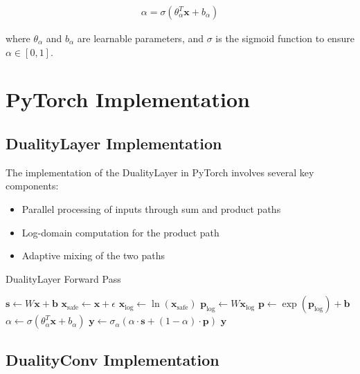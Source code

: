 \documentclass{article}
\begin{document}
\begin{align}
\alpha = \sigma(\theta_\alpha^T \mathbf{x} + b_\alpha)
\end{align}

where $\theta_\alpha$ and $b_\alpha$ are learnable parameters, and $\sigma$ is the sigmoid function to ensure $\alpha \in [0, 1]$.

\section{PyTorch Implementation}

\subsection{DualityLayer Implementation}

The implementation of the DualityLayer in PyTorch involves several key components:

\begin{itemize}
    \item Parallel processing of inputs through sum and product paths
    \item Log-domain computation for the product path
    \item Adaptive mixing of the two paths
\end{itemize}

\begin{algorithm}
\caption{DualityLayer Forward Pass}
\begin{algorithmic}[1]
    \State $\mathbf{s} \gets W\mathbf{x} + \mathbf{b}$ 
    \State $\mathbf{x}_{\text{safe}} \gets \mathbf{x} + \epsilon$ 
    \State $\mathbf{x}_{\text{log}} \gets \ln(\mathbf{x}_{\text{safe}})$ 
    \State $\mathbf{p}_{\text{log}} \gets W\mathbf{x}_{\text{log}}$ 
    \State $\mathbf{p} \gets \exp(\mathbf{p}_{\text{log}}) + \mathbf{b}$ 
    \State $\alpha \gets \sigma(\theta_\alpha^T \mathbf{x} + b_\alpha)$ 
    \State $\mathbf{y} \gets \sigma_\alpha(\alpha \cdot \mathbf{s} + (1-\alpha) \cdot \mathbf{p})$ 
    \State \Return $\mathbf{y}$
\EndFunction
\end{algorithmic}
\end{algorithm}

\subsection{DualityConv Implementation}
\end{document}
